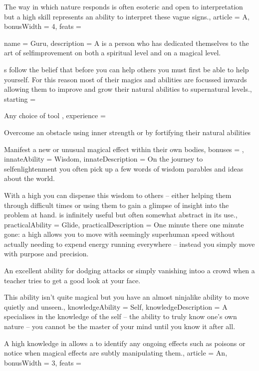 {The way in which nature responds is often esoteric and open to interpretation\comma{} but a high  skill represents an ability to interpret these vague signs.,
	article = A,
	bonusWidth = 4, feats = \DruidFeats
}

\archetype
{
	name = Guru,
	description = A \bname{} is a person who has dedicated themselves to the art of self\minus{}improvement\comma{} on both a spiritual level\comma{} and on a magical level. 

\bname{}s follow the belief that before you can help others\comma{} you must first be able to help yourself. For this reason\comma{} most of their magics and abilities are focussed inwards\comma{} allowing them to improve and grow their natural abilities to supernatural levels.,
	starting = 
\item Any choice of tool 
,
	experience = \item Overcome an obstacle using inner strength\comma{} or by fortifying their natural abilities
\item Manifest a new or unusual magical effect within their own bodies,
	bonuses = 
,
	innateAbility = Wisdom,
	innateDescription = On the journey to self\minus{}enlightenment\comma{} you often pick up a few words of wisdom\comma{} parables and ideas about the world. 

With a high \comma{} you can dispense this wisdom to others – either helping them through difficult times\comma{} or using them to gain a glimpse of insight into the problem at hand.  is infinitely useful\comma{} but often somewhat abstract in its use.,
	practicalAbility = Glide,
	practicalDescription = One minute there\comma{} one minute gone: a high  allows you to move with seemingly superhuman speed\comma{} without actually needing to expend energy running everywhere – instead you simply move with purpose and precision. 

An excellent ability for dodging attacks\comma{} or simply vanishing intoo a crowd when a teacher tries to get a good look at your face. 

This ability isn’t quite magical\comma{} but you have an almost ninja\minus{}like ability to move quietly and unseen.,
	knowledgeAbility = Self,
	knowledgeDescription = A \bname{} specialises in the knowledge of the self – the ability to truly know one’s own nature – you cannot be the master of your mind until you know it\comma{} after all. 

A high knowledge in  allows a \bname{} to identify any ongoing effects such as poisons\comma{} or notice when magical effects are subtly manipulating them.,
	article = An,
	bonusWidth = 3, feats = \GuruFeats
}

